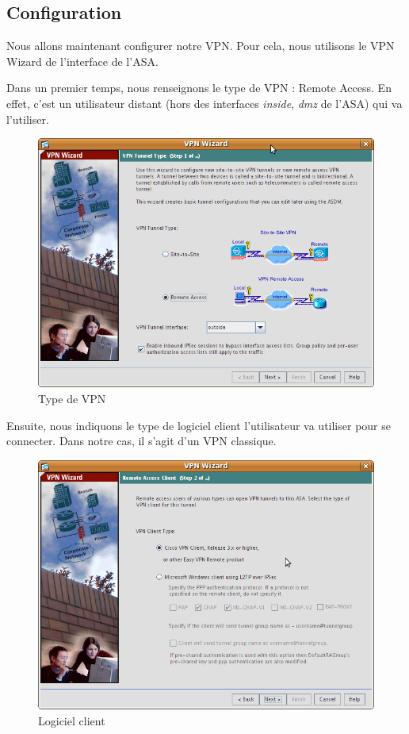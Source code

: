 \documentclass[a4paper,12pt]{article}
\begin{document}
\subsection{Configuration}
Nous allons maintenant configurer notre VPN. Pour cela, nous utilisons le \og VPN Wizard \fg{} de l'interface de l'ASA.

Dans un premier temps, nous renseignons le type de VPN : Remote Access. En effet, c'est un utilisateur distant (hors des interfaces \textit{inside}, 
\textit{dmz} de l'ASA) qui va l'utiliser.
\begin{figure}[H]
	\center
	\includegraphics[width=12cm]{img/vpn1.png}
	\caption{Type de VPN}
\end{figure}

Ensuite, nous indiquons le type de logiciel client l'utilisateur va utiliser pour se connecter. Dans notre cas, il s'agit d'un VPN classique.
\begin{figure}[H]
	\center
	\includegraphics[width=12cm]{img/vpn2.png}
	\caption{Logiciel client}
\end{figure}
\end{document}
